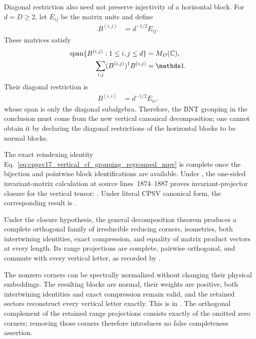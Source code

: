 \documentclass{article}
\begin{document}
Diagonal restriction also need not preserve injectivity of a horizontal block.
For $d=D\geq2$, let $E_{ij}$ be the matrix units and define
\begin{align}
    B^{(i,j)}
     & =d^{-1/2}E_{ij}.
    \label{eq:cpgsv17_vertical_cf_grouping_matrix_unit_block}
\end{align}
These matrices satisfy
\begin{align}
    \operatorname{span}
    \{B^{(i,j)}:1\leq i,j\leq d\}
     & =M_D(\C),
    \label{eq:cpgsv17_vertical_cf_grouping_full_matrix_span} \\
    \sum_{i,j}(B^{(i,j)})^\dagger B^{(i,j)}
     & =\Id.
    \label{eq:cpgsv17_vertical_cf_grouping_matrix_unit_normalization}
\end{align}
Their diagonal restriction is
\begin{align}
    B^{(i,i)}
     & =d^{-1/2}E_{ii},
    \label{eq:cpgsv17_vertical_cf_grouping_diagonal_restriction}
\end{align}
whose span is only the diagonal subalgebra. Therefore, the BNT grouping in the
conclusion must come from the new vertical canonical decomposition; one cannot
obtain it by declaring the diagonal restrictions of the horizontal blocks to
be normal blocks.

The exact reindexing identity
Eq.~\ref{eq:cpgsv17_vertical_cf_grouping_regrouped_mpv} is complete once the
bijection and pointwise block identifications are available. Under
, the one-sided invariant-matrix calculation at
source lines~1874--1887 proves invariant-projector closure for the vertical
tensor:
.
Under literal CPSV canonical form, the corresponding result is
.

Under the closure hypothesis, the general decomposition theorem
produces a complete orthogonal family of irreducible reducing corners,
isometries, both intertwining identities, exact compression, and equality of
matrix product vectors at every length. Its range projections are complete,
pairwise orthogonal, and commute with every vertical letter, as recorded by
.

The nonzero corners can be spectrally normalized without changing their
physical embeddings. The resulting blocks are normal, their weights are
positive, both intertwining identities and exact compression remain valid, and
the retained sectors reconstruct every vertical letter exactly. This is
in . The orthogonal complement of
the retained range projections consists exactly of the omitted zero corners;
removing those corners therefore introduces no false completeness assertion.
\end{document}
